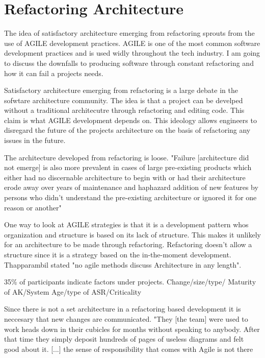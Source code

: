 \documentclass[12pt]{article}
\newcommand\tab[1][1cm]{\hspace*{#1}}
\begin{document}
\maketitle


\section*{\tab \tab \tab Refactoring Architecture}
\tab The idea of satisfactory architecture emerging from refactoring sprouts
from the use of AGILE development practices. AGILE is one of the most 
common software development practices and is used widly throughout the 
tech industry. I am going to discuss the downfalls to producing software
through constant refactoring and how it can fail a projects needs.

\tab Satisfactory architecture emerging from refactoring is a large debate
in the sofwtare architecture community. The idea is that a project can be develped 
without a traditional architecutre through refactoring and editing code. This 
claim is what AGILE development depends on. This ideology allows engineers
to disregard the future of the projects architecture on the basis of refactoring
any issues in the future. 

\tab The architecture developed from refactoring is loose. "Failure 
[architecture did not emerge] is also more prevalent in cases of    
large    pre-existing    products    which    either    had    no    
discernable   architecture   to   begin   with   or   had   their   
architecture  erode  away  over  years  of  maintenance  and  haphazard  
addition  of  new  features  by  persons  who  didn't  understand the 
pre-existing architecture or ignored it for one reason or another"

\tab One way to look at AGILE strategies is that it is a development pattern 
whos organization and structure is based on its lack of structure. This makes 
it unlikely for an architecture to be made through refactoring. Refactoring 
doesn't allow a structure since it is a strategy based on the in-the-moment
development. Thapparambil stated "no agile methods discuss Architecture in 
any length". 

\tab 35\% of participants indicate factors under projects. Change/size/type/
Maturity of AK/System Age/type of ASR/Criticality

\tab Since there is not a set architecture in a refactoring based development
it is neccesary that new changes are communicated. "They  [the  team]  were  
used  to  work  heads  down  in  their cubicles for months without speaking to
 anybody. After that time they simply deposit hundreds of pages of  
 useless diagrams and felt good about it. [...] the sense 
 of responsibility that comes with Agile is not there
\end{document}
